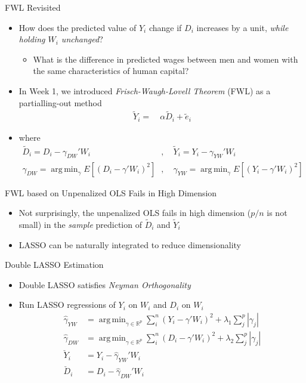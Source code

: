 \documentclass[aspectratio=1610,12pt,xcolor=dvipsnames]{beamer}
\DeclareMathOperator*{\argmin}{arg\,min}
\begin{document}
\begin{frame}{FWL Revisited}

\begin{itemize}
    \item How does the predicted value of $Y_i$ change if $D_i$ increases by a unit, \textit{while holding $W_i$ unchanged}?
\begin{itemize}
    \item What is the difference in predicted wages between men and women with the same characteristics of human capital?
\end{itemize}
    \item In Week 1, we introduced \textit{Frisch-Waugh-Lovell Theorem} (FWL) as a partialling-out method
\begin{align*}
\tilde{Y}_i = \: &\alpha\tilde{D}_i + \tilde{e}_i
\end{align*}
    \item where
    \begin{align*}
        \tilde{D}_i = D_i - \gamma_{DW}' W_i&, \quad
\tilde{Y}_i = Y_i - \gamma_{YW}' W_i \\
\gamma_{DW} = \argmin_{\gamma} E\left[ (D_i - \gamma'W_i)^2 \right]&, \quad
\gamma_{YW} = \argmin_{\gamma} E\left[ (Y_i - \gamma'W_i)^2 \right]
    \end{align*}
\end{itemize}
\end{frame}

\begin{frame}{FWL based on Unpenalized OLS Fails in High Dimension}

\begin{itemize}
    \item Not surprisingly, the unpenalized OLS fails in high dimension ($p/n$ is not small) in the \textit{sample} prediction of $\tilde D_i$ and $\tilde Y_i$
    \item LASSO can be naturally integrated to reduce dimensionality
\end{itemize}
\end{frame}

\begin{frame}{Double LASSO Estimation}

\begin{itemize}
    \item Double LASSO satisfies \textit{Neyman Orthogonality}
    \item Run LASSO regressions of $Y_i$ on $W_i$ and $D_i$ on $W_i$
    \begin{align*}
    \hat \gamma_{YW} &= \argmin_{\gamma \in \mathbb{R}^p} \sum_i^n (Y_i - \gamma'W_i)^2 + \lambda_1 \sum_j^p |\gamma_j| \\
    \hat \gamma_{DW} &= \argmin_{\gamma \in \mathbb{R}^p} \sum_i^n (D_i - \gamma'W_i)^2 + \lambda_2 \sum_j^p |\gamma_j|  \\
    \check{Y}_i &= Y_i - \hat \gamma_{YW}' W_i  \\
    \check{D}_i &= D_i - \hat \gamma_{DW}' W_i
    \end{align*}
\end{itemize}
\end{frame}
\end{document}
